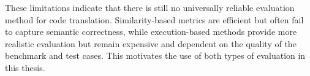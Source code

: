 These limitations indicate that there is still no universally reliable
evaluation method for code translation. Similarity-based metrics are efficient
but often fail to capture semantic correctness, while execution-based methods
provide more realistic evaluation but remain expensive and dependent on the
quality of the benchmark and test cases. This motivates the use of both types
of evaluation in this thesis. %
